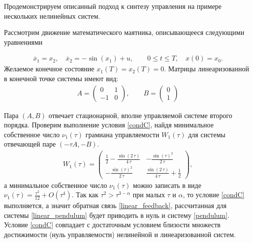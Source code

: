 \documentclass[../main.tex]{subfiles}
\begin{document}
	Продемонстрируем описанный подход к синтезу управления на примере нескольких нелинейных систем. 
	
	
	\begin{pr}
	Рассмотрим движение математического маятника, описывающееся следующими уравнениями 
	
	\begin{gather}\label{pendulum}
		\dot{x_1} = x_2, \quad 
		\dot{x_2} = -\sin(x_1) + u, \qquad
		0 \leqslant t \leqslant T, \quad
		x(0) = x_0.
	\end{gather}
	Желаемое конечное состояние $ x_1(T) = x_2(T) =  0 $. Матрицы линеаризованной в конечной точке системы имеют вид:
	\begin{gather}\label{linear_pendulum}
		A = \begin{pmatrix}
			0 & 1\\
			-1 & 0
		\end{pmatrix}, \qquad 
		B = \begin{pmatrix}
			0 \\
			1
		\end{pmatrix}
	\end{gather}
	
	Пара $(A,B)$ отвечает стационарной, вполне управляемой системе второго порядка. Проверим выполнение условия \ref{condC}, найдя минимальное собственное число $ \nu_1(\tau) $ грамиана управляемости $W_1(\tau)$ для системы отвечающей паре $(-\tau A, -B) $. 
	\begin{gather*}
		W_1(\tau) = \begin{pmatrix}  \frac{1}{2}-\frac{\sin\left(2\,\tau \right)}{4\,\tau } & -\frac{{\sin\left(\tau \right)}^2}{2\,\tau }\\ -\frac{{\sin\left(\tau \right)}^2}{2\,\tau } & \frac{\sin\left(2\,\tau \right)}{4\,\tau }+\frac{1}{2} \end{pmatrix},
	\end{gather*}
	а минимальное собственное число $ \nu_1(\tau) $ можно записать в виде $\nu_1(\tau) = \frac{\tau ^2}{12}+O(\tau^4) $. Так как $\tau^2  > \tau^{3-\alpha} $ при малых $\tau$ и $\alpha$, то условие \ref{condC} выполняется, а значит обратная связь \eqref{linear_feedback}, рассчитанная для системы \eqref{linear_pendulum}  будет приводить в нуль и систему \eqref{pendulum}.  Условие \ref{condC} совпадает с достаточным условием близости множеств достижимости (нуль управляемости) нелинейной и линеаризованной систем. 
	

\end{pr}
\end{document}
